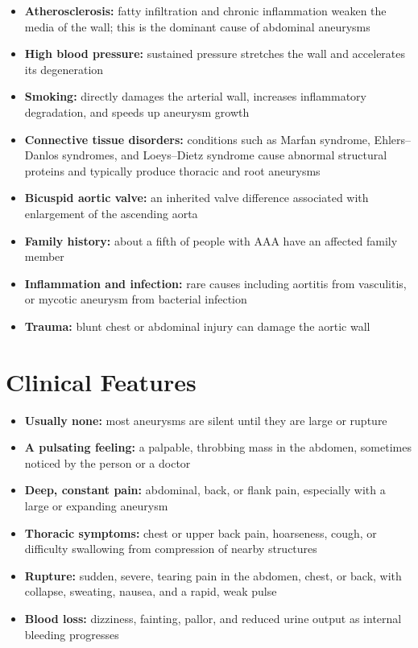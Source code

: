 \begin{itemize}
    \item \textbf{Atherosclerosis:} fatty infiltration and chronic inflammation weaken the media of the wall; this is the dominant cause of abdominal aneurysms
    \item \textbf{High blood pressure:} sustained pressure stretches the wall and accelerates its degeneration
    \item \textbf{Smoking:} directly damages the arterial wall, increases inflammatory degradation, and speeds up aneurysm growth
    \item \textbf{Connective tissue disorders:} conditions such as Marfan syndrome, Ehlers--Danlos syndromes, and Loeys--Dietz syndrome cause abnormal structural proteins and typically produce thoracic and root aneurysms
    \item \textbf{Bicuspid aortic valve:} an inherited valve difference associated with enlargement of the ascending aorta
    \item \textbf{Family history:} about a fifth of people with AAA have an affected family member
    \item \textbf{Inflammation and infection:} rare causes including aortitis from vasculitis, or mycotic aneurysm from bacterial infection
    \item \textbf{Trauma:} blunt chest or abdominal injury can damage the aortic wall
\end{itemize}

\section*{Clinical Features}
\begin{itemize}
    \item \textbf{Usually none:} most aneurysms are silent until they are large or rupture
    \item \textbf{A pulsating feeling:} a palpable, throbbing mass in the abdomen, sometimes noticed by the person or a doctor
    \item \textbf{Deep, constant pain:} abdominal, back, or flank pain, especially with a large or expanding aneurysm
    \item \textbf{Thoracic symptoms:} chest or upper back pain, hoarseness, cough, or difficulty swallowing from compression of nearby structures
    \item \textbf{Rupture:} sudden, severe, tearing pain in the abdomen, chest, or back, with collapse, sweating, nausea, and a rapid, weak pulse
    \item \textbf{Blood loss:} dizziness, fainting, pallor, and reduced urine output as internal bleeding progresses
\end{itemize}

